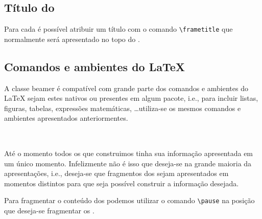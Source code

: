 \subsection{T\'{i}tulo do }
Para cada  \'{e} poss\'{i}vel atribuir um t\'{i}tulo com o comando \lstinline!\frametitle! que normalmente ser\'{a} apresentado no topo do . \\

\subsection{Comandos e ambientes do LaTeX}
A classe beamer \'{e} compat\'{i}vel com grande parte dos comandos e ambientes do LaTeX sejam estes nativos ou presentes em algum pacote, i.e., para incluir listas, figuras, tabelas, express\~{o}es matem\'{a}ticas, \ldots utiliza-se os mesmos comandos e ambientes apresentados anteriormentes. \\
 \\
\subsection{}
At\'{e} o momento todos os  que construimos tinha sua informa\c{c}\~{a}o apresentada em um \'{u}nico momento. Infelizmente n\~{a}o \'{e} isso que deseja-se na grande maioria da apresenta\c{c}\~{o}es, i.e., deseja-se que fragmentos dos  sejam apresentados em momentos distintos para que seja poss\'{i}vel construir a informa\c{c}\~{a}o desejada.

Para fragmentar o conte\'{u}do dos  podemos utilizar o comando \lstinline!\pause! na posi\c{c}\~{a}o que deseja-se fragmentar os . \\
\begin{minipage}[c]{0.5\textwidth}
\end{minipage} \quad \vrule \quad
\begin{minipage}[c]{0.35\textwidth}
\end{minipage}


